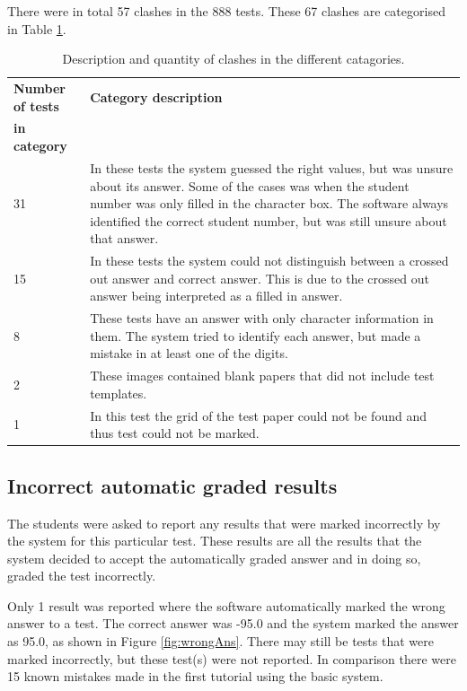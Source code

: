 There were in total 57 clashes in the 888 tests. These 67 clashes are categorised in Table  \ref{tbl:TutClash}.
\begin{table}
  \centering
  \caption{Description and quantity of clashes in the different catagories.} \label{tbl:TutClash}
\begin{tabular}{|p{3cm}|p{8cm}|}
\hline
\textbf{Number of tests} & \textbf{Category description}\\
\textbf{in category} &\\
\hline
31&In these tests the system guessed the right values, but was unsure about its answer. Some of the cases was when the student number was only filled in the character box. The software always identified the correct student number, but was still unsure about that answer.\\
\hline
15&In these tests the system could not distinguish between a crossed out answer and correct answer. This is due to the crossed out answer being interpreted as a filled in answer.\\
\hline
8&These tests have an answer with only character information in them. The system tried to identify each answer, but made a mistake in at least one of the digits.\\
\hline
2&These images contained blank papers that did not include test templates.\\
\hline
1&In this test the grid of the test paper could not be found and thus test could not be marked.\\
\hline
\end{tabular}
\end{table}

\subsection{Incorrect automatic graded results}

The students were asked to report any results that were marked incorrectly by the system for this particular test. These results are all the results that the system decided to accept the automatically graded answer and in doing so, graded the test incorrectly.

Only 1 result was reported where the software automatically marked the wrong answer to a test. The correct answer was -95.0 and the system marked the answer as 95.0, as shown in Figure \ref{fig:wrongAns}. There may still be tests that were marked incorrectly, but these test(s) were not reported. In comparison there were 15 known mistakes made in the first tutorial using the basic system.

